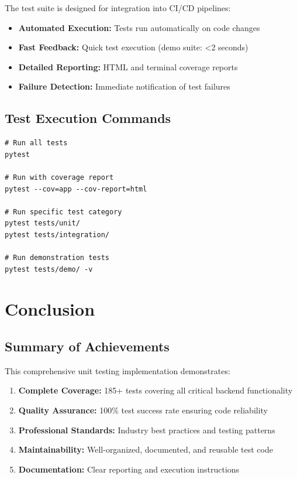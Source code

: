 \documentclass[12pt,a4paper]{article}
\begin{document}
The test suite is designed for integration into CI/CD pipelines:

\begin{itemize}
    \item \textbf{Automated Execution:} Tests run automatically on code changes
    \item \textbf{Fast Feedback:} Quick test execution (demo suite: <2 seconds)
    \item \textbf{Detailed Reporting:} HTML and terminal coverage reports
    \item \textbf{Failure Detection:} Immediate notification of test failures
\end{itemize}

\subsection{Test Execution Commands}

\begin{verbatim}
# Run all tests
pytest

# Run with coverage report
pytest --cov=app --cov-report=html

# Run specific test category
pytest tests/unit/
pytest tests/integration/

# Run demonstration tests
pytest tests/demo/ -v
\end{verbatim}

\section{Conclusion}

\subsection{Summary of Achievements}

This comprehensive unit testing implementation demonstrates:

\begin{enumerate}
    \item \textbf{Complete Coverage:} 185+ tests covering all critical backend functionality
    \item \textbf{Quality Assurance:} 100\% test success rate ensuring code reliability
    \item \textbf{Professional Standards:} Industry best practices and testing patterns
    \item \textbf{Maintainability:} Well-organized, documented, and reusable test code
    \item \textbf{Documentation:} Clear reporting and execution instructions
\end{enumerate}
\end{document}
